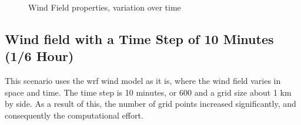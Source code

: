 \begin{figure} [hbt!]
  \centering
  \hfill
    \hfill
  \caption{Wind Field properties, variation over time} %
\label{fig:m3_wind}
\end{figure}

\subsection{Wind field with a Time Step of 10 Minutes (1/6 Hour)}

This scenario uses the \acrshort{wrf} wind model as it is, where the wind field varies in space and time. The time step is 10 minutes, or 600 and a grid size about 1 km by side. %
As a result of this, the number of grid points increased significantly, and consequently the  computational effort. \par

